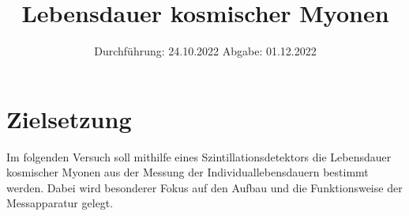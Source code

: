 

\usepackage[nolist,nohyperlinks]{acronym}

\usepackage{longtable}


\subject{V01}
\title{Lebensdauer kosmischer Myonen}
\date{
    Durchführung: 24.10.2022
     \hspace{3em}
    Abgabe: 01.12.2022
}


\maketitle
{}

\section{Zielsetzung}

    Im folgenden Versuch soll mithilfe eines Szintillationsdetektors die Lebensdauer kosmischer Myonen aus der Messung der Individuallebensdauern bestimmt werden.
    Dabei wird besonderer Fokus auf den Aufbau und die Funktionsweise der Messapparatur gelegt.


\clearpage


\clearpage


\clearpage


\clearpage

\printbibliography
\clearpage

\appendix



